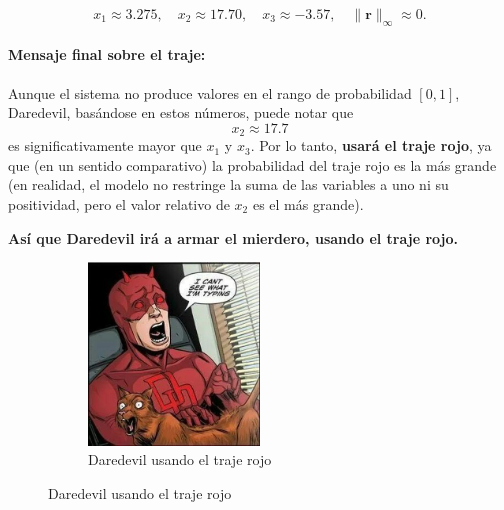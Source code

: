 \[
\boxed{
x_1 \approx 3.275,\quad
x_2 \approx 17.70,\quad
x_3 \approx -3.57,\quad
\|\mathbf{r}\|_\infty \approx 0.
}
\]

\paragraph{Mensaje final sobre el traje:}
Aunque el sistema no produce valores en el rango de probabilidad \([0,1]\),
Daredevil, basándose en estos números, puede notar que 
\[
x_2 \approx 17.7
\]
es significativamente mayor que \(x_1\) y \(x_3\). Por lo tanto, \textbf{usará el traje rojo},
ya que (en un sentido comparativo) la probabilidad del traje rojo es la más grande 
(en realidad, el modelo no restringe la suma de las variables a uno ni su positividad, 
pero el valor relativo de \(x_2\) es el más grande).

\textbf{Así que Daredevil irá a armar el mierdero, usando el traje rojo.}

\begin{figure}[H]
  \centering
  \begin{subfigure}[b]{\textwidth}
      \centering
      \includegraphics[width=0.5\textwidth]{Figures/0. General/daredevil.jpeg}
      \caption{Daredevil usando el traje rojo}
      \label{fig: Daredevil usando el traje rojo}
  \end{subfigure}
\end{figure}

